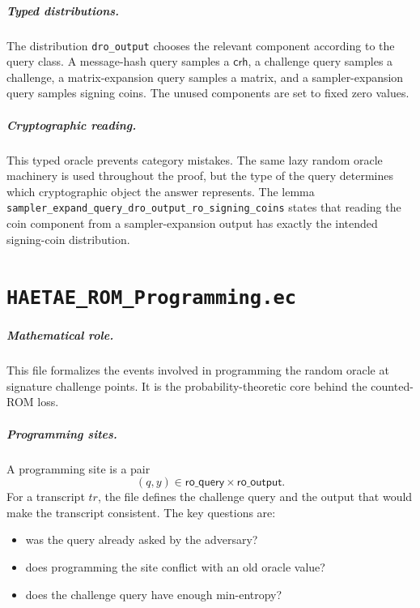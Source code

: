 \documentclass[11pt]{report}
\newcommand{\ec}[1]{\nolinkurl{#1}}
\newcommand{\ecchapter}[2]{\chapter{\texorpdfstring{\texttt{#1}}{#2}}}
\theoremstyle{definition}
\theoremstyle{plain}
\theoremstyle{definition}
\begin{document}
\paragraph{Typed distributions.}
The distribution \ec{dro_output} chooses the relevant component according to
the query class.  A message-hash query samples a \(\mathsf{crh}\), a challenge
query samples a challenge, a matrix-expansion query samples a matrix, and a
sampler-expansion query samples signing coins.  The unused components are set
to fixed zero values.

\paragraph{Cryptographic reading.}
This typed oracle prevents category mistakes.  The same lazy random oracle
machinery is used throughout the proof, but the type of the query determines
which cryptographic object the answer represents.  The lemma
\ec{sampler_expand_query_dro_output_ro_signing_coins} states that reading the
coin component from a sampler-expansion output has exactly the intended
signing-coin distribution.



\ecchapter{HAETAE\_ROM\_Programming.ec}{HAETAE ROM Programming.ec}

\paragraph{Mathematical role.}
This file formalizes the events involved in programming the random oracle at
signature challenge points.  It is the probability-theoretic core behind the
counted-ROM loss.

\paragraph{Programming sites.}
A programming site is a pair
\[
  (q,y)\in \mathsf{ro\_query}\times\mathsf{ro\_output}.
\]
For a transcript \(tr\), the file defines the challenge query and the output
that would make the transcript consistent.  The key questions are:
\begin{itemize}[leftmargin=*]
  \item was the query already asked by the adversary?
  \item does programming the site conflict with an old oracle value?
  \item does the challenge query have enough min-entropy?
\end{itemize}
\end{document}
